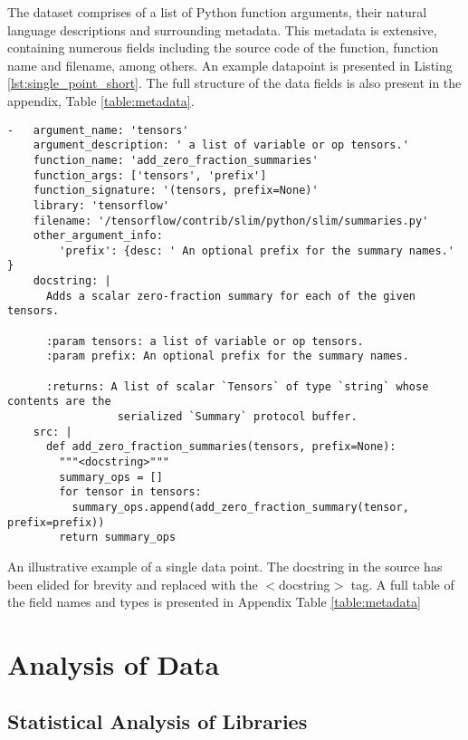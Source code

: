 The dataset comprises of a list of Python function arguments, their natural language descriptions and surrounding metadata. 
This metadata is extensive, containing numerous fields including the source code of the function, function name and filename, among others. 
An example datapoint is presented in Listing \ref{lst:single_point_short}. The full structure of the data fields is also present in the appendix, Table \ref{table:metadata}. 

\begin{listing}[ht!]
\begin{verbatim}
-   argument_name: 'tensors'                                 
    argument_description: ' a list of variable or op tensors.'  
    function_name: 'add_zero_fraction_summaries'                
    function_args: ['tensors', 'prefix']                         
    function_signature: '(tensors, prefix=None)'                    
    library: 'tensorflow'                                
    filename: '/tensorflow/contrib/slim/python/slim/summaries.py'  
    other_argument_info:             
        'prefix': {desc: ' An optional prefix for the summary names.' }
    docstring: |
      Adds a scalar zero-fraction summary for each of the given tensors.

      :param tensors: a list of variable or op tensors.
      :param prefix: An optional prefix for the summary names.

      :returns: A list of scalar `Tensors` of type `string` whose contents are the
                 serialized `Summary` protocol buffer.
    src: |
      def add_zero_fraction_summaries(tensors, prefix=None):
        """<docstring>"""
        summary_ops = []
        for tensor in tensors:
          summary_ops.append(add_zero_fraction_summary(tensor, prefix=prefix))
        return summary_ops
\end{verbatim}
     \caption{An illustrative example of a single data point. The docstring in the source has been elided for brevity and replaced with the $<$docstring$>$ tag. A full table of the field names and types is presented in Appendix Table \ref{table:metadata}}
     \label{lst:single_point_short}
\end{listing}


\section{Analysis of Data} %
\label{sec:analysis_of_data}

\subsection{Statistical Analysis of Libraries}

